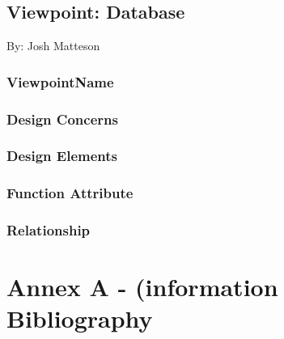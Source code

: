 \documentclass[letterpaper, 10pt, draftclsnofoot, compsoc, onecolumn]{IEEEtran}
\begin{document}
\newpage

\subsection{Viewpoint: Database}
{\noindent By: Josh Matteson \par}

\subsubsection{ViewpointName}
{\noindent  \par}

\subsubsection{Design Concerns}
{\noindent  \par}

\subsubsection{Design Elements}
{\noindent  \par}

\subsubsection{Function Attribute}
{\noindent  \par}

\subsubsection{Relationship}







\newpage

\section{Annex A - (information Bibliography}

\nocite{*}




\end{document}
